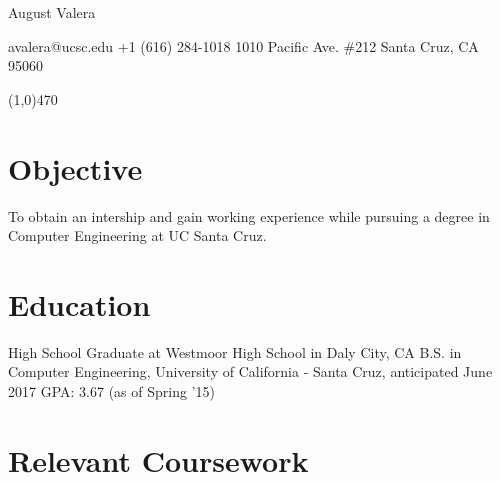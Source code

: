 \documentclass{article}
\begin{document}
\centerline{
  \LARGE
  August Valera
}
\centerline{
  avalera@ucsc.edu \textbullet \hspace{5pt} 
  +1 (616) 284-1018 \textbullet \hspace{5pt}
  1010 Pacific Ave. \#212 \textbullet \hspace{5pt}
  Santa Cruz, CA 95060
}
\line(1,0){470}

\bigskip

\section*{Objective}
To obtain an intership and gain working experience while pursuing a degree in Computer Engineering at UC Santa Cruz.

\section*{Education}
High School Graduate at Westmoor High School in Daly City, CA
B.S. in Computer Engineering, University of California - Santa Cruz, anticipated June 2017
GPA: 3.67 (as of Spring '15)

\section*{Relevant Coursework}
\end{document}
